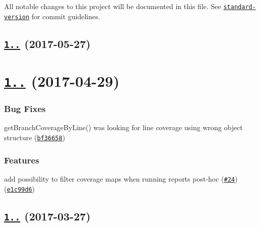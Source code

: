 All notable changes to this project will be documented in this file. See \href{https://github.com/conventional-changelog/standard-version}{\tt standard-\/version} for commit guidelines.

\label{_1.1.1}%
 \subsection*{\href{https://github.com/istanbuljs/istanbuljs/compare/istanbul-lib-coverage@1.1.0...istanbul-lib-coverage@1.1.1}{\tt 1..} (2017-\/05-\/27)}

\label{_1.1.0}%
 \section*{\href{https://github.com/istanbuljs/istanbul-lib-coverage/compare/istanbul-lib-coverage@1.0.2...istanbul-lib-coverage@1.1.0}{\tt 1..} (2017-\/04-\/29)}

\subsubsection*{Bug Fixes}


\begin{DoxyItemize}
\item get\+Branch\+Coverage\+By\+Line() was looking for line coverage using wrong object structure (\href{https://github.com/istanbuljs/istanbul-lib-coverage/commit/bf36658}{\tt bf36658})
\end{DoxyItemize}

\subsubsection*{Features}


\begin{DoxyItemize}
\item add possibility to filter coverage maps when running reports post-\/hoc (\href{https://github.com/istanbuljs/istanbuljs/issues/24}{\tt \#24}) (\href{https://github.com/istanbuljs/istanbul-lib-coverage/commit/e1c99d6}{\tt e1c99d6})
\end{DoxyItemize}

\label{_1.0.2}%
 \subsection*{\href{https://github.com/istanbuljs/istanbul-lib-coverage/compare/istanbul-lib-coverage@1.0.1...istanbul-lib-coverage@1.0.2}{\tt 1..} (2017-\/03-\/27)}

